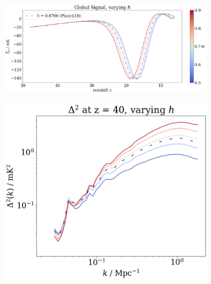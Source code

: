\documentclass[floats,floatfix,showpacs,amssymb,prd,superscriptaddress,nofootinbib]{revtex4-2} %
\begin{document}
\begin{figure}[H]
     \centering
     \begin{subfigure}[b]{0.9\textwidth}
         \centering
         \includegraphics[width=\textwidth]{images/simulation_results/global_signal_h.png}
         \label{fig:global_signal_h}
     \end{subfigure}
     \hfill
     \begin{subfigure}[b]{0.45\textwidth}
         \centering
         \includegraphics[width=\textwidth]{images/simulation_results/power_spectrum_fixed_z_40_h.png}
         \label{fig:power_spectrum_fixed_z_40_h}
     \end{subfigure}
     \hfill
     \begin{subfigure}[b]{0.45\textwidth}
         \centering

\end{subfigure}
\end{figure}
\end{document}
